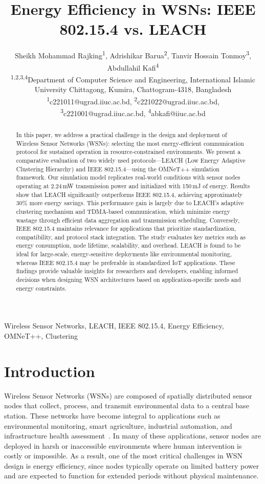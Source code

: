 \documentclass[conference]{IEEEtran}
\title{Energy Efficiency in WSNs: IEEE 802.15.4 vs. LEACH}
\author{
    Sheikh Mohammad Rajking\textsuperscript{1}, Adrishikar Barua\textsuperscript{2}, Tanvir Hossain Tonmoy\textsuperscript{3}, Abdullahil Kafi\textsuperscript{4}\\
    \textsuperscript{1,2,3,4}Department of Computer Science and Engineering, International Islamic University Chittagong, Kumira, Chattogram-4318, Bangladesh\\
    \textsuperscript{1}c221011@ugrad.iiuc.ac.bd,
    \textsuperscript{2}c221022@ugrad.iiuc.ac.bd,
    \textsuperscript{3}c221001@ugrad.iiuc.ac.bd,
    \textsuperscript{4}abkafi@iiuc.ac.bd
}
\begin{document}
\maketitle

\begin{abstract}
In this paper, we address a practical challenge in the design and deployment of Wireless Sensor Networks (WSNs): selecting the most energy-efficient communication protocol for sustained operation in resource-constrained environments. We present a comparative evaluation of two widely used protocols—LEACH (Low Energy Adaptive Clustering Hierarchy) and IEEE 802.15.4—using the OMNeT++ simulation framework. Our simulation model replicates real-world conditions with sensor nodes operating at 2.24\,mW transmission power and initialized with 150\,mJ of energy. Results show that LEACH significantly outperforms IEEE 802.15.4, achieving approximately 30\% more energy savings. This performance gain is largely due to LEACH's adaptive clustering mechanism and TDMA-based communication, which minimize energy wastage through efficient data aggregation and transmission scheduling. Conversely, IEEE 802.15.4 maintains relevance for applications that prioritize standardization, compatibility, and protocol stack integration. The study evaluates key metrics such as energy consumption, node lifetime, scalability, and overhead. LEACH is found to be ideal for large-scale, energy-sensitive deployments like environmental monitoring, whereas IEEE 802.15.4 may be preferable in standardized IoT applications. These findings provide valuable insights for researchers and developers, enabling informed decisions when designing WSN architectures based on application-specific needs and energy constraints.
\end{abstract}

\begin{IEEEkeywords}
Wireless Sensor Networks, LEACH, IEEE 802.15.4, Energy Efficiency, OMNeT++, Clustering
\end{IEEEkeywords}

\section{Introduction}

Wireless Sensor Networks (WSNs) are composed of spatially distributed sensor nodes that collect, process, and transmit environmental data to a central base station. These networks have become integral to applications such as environmental monitoring, smart agriculture, industrial automation, and infrastructure health assessment~\cite{sensor_ref}. In many of these applications, sensor nodes are deployed in harsh or inaccessible environments where human intervention is costly or impossible. As a result, one of the most critical challenges in WSN design is energy efficiency, since nodes typically operate on limited battery power and are expected to function for extended periods without physical maintenance.
\end{document}
